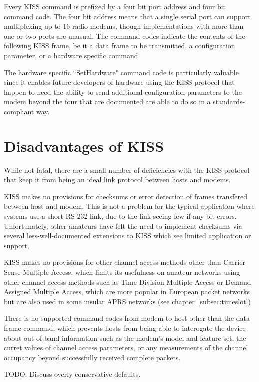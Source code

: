 Every KISS command is prefixed by a four bit port address and four bit 
command code. The four bit address means that a single serial port can 
support multiplexing up to 16 radio modems, though implementations with more
than one or two ports are unusual. The command codes indicate the contents of the 
following KISS frame, be it a data frame to be transmitted, a configuration
parameter, or a hardware specific command.

The hardware specific ``SetHardware" command code is particularly valuable
since it enables future developers of hardware using the KISS protocol
that happen to need the ability to send additional configuration parameters
to the modem beyond the four that are documented are able to do so in a
standards-compliant way.

\section{Disadvantages of KISS}

While not fatal, there are a small number of deficiencies with the KISS
protocol that keep it from being an ideal link protocol between hosts and modems.

KISS makes no provisions for checksums or error detection of frames transfered
between host and modem. This is not a problem for the typical application where
systems use a short RS-232 link, due to the link seeing few if any bit errors.
Unfortunately, other amateurs have felt the need to implement checksums via
several less-well-documented extensions to KISS which see limited application
or support.

KISS makes no provisions for other channel access methods other than
Carrier Sense Multiple Access, which limits its usefulness on amateur networks
using other channel access methods such as Time Division Multiple Access
or Demand Assigned Multiple Access, which are more popular in European 
packet networks but are also used in some insular APRS networks 
(see chapter~\ref{subsec:timeslot})

There is no supported command codes from modem to host other than the data frame
command, which prevents hosts from being able to interogate the device 
about out-of-band information such as the modem's model and feature set,
the curret values of channel access parameters, or any measurements of the 
channel occupancy beyond successfully received complete packets.

TODO: Discuss overly conservative defaults.

